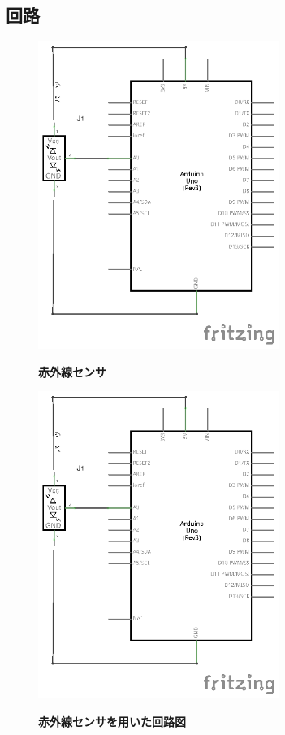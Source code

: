 \documentclass[11pt,a4paper]{jarticle}
\begin{document}
\subsection*{回路}
\begin{figure}[h!]
 \begin{minipage}{0.5\columnwidth}
  \centering
  \includegraphics[height=100mm]{img/Sekigai.eps}
  \begin{center}
   \textbf{赤外線センサ}
  \end{center}
 \end{minipage}
 \begin{minipage}{0.5\columnwidth}
  \centering
  \includegraphics[height=100mm]{img/Sekigai.eps}
  \begin{center}
   \textbf{赤外線センサを用いた回路図}
  \end{center}
 \end{minipage}
\end{figure}
\end{document}
